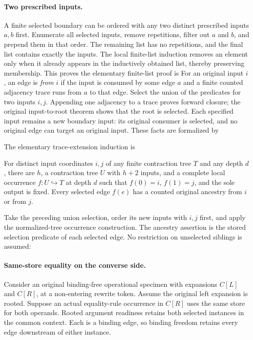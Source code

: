 \paragraph{Two prescribed inputs.}
A finite selected boundary can be ordered with any two distinct prescribed
inputs $a,b$ first. Enumerate all selected inputs, remove repetitions, filter
out $a$ and $b$, and prepend them in that order. The remaining list has no
repetitions, and the final list contains exactly the inputs. The local
finite-list induction removes an element only when it already appears in the
inductively obtained list, thereby preserving membership. This proves
the elementary finite-list proof is
For an original input $i$, an edge is \emph{from $i$} if the input is consumed
by some edge $a$ and a finite counted adjacency trace runs from $a$ to that
edge. Select the union of the predicates for two inputs $i,j$. Appending one
adjacency to a trace proves forward closure; the original input-to-root theorem
shows that the root is selected. Each specified input remains a new boundary
input: its original consumer is selected, and no original edge can target an
original input. These facts are formalized by
\par{}
The elementary trace-extension induction is
\begin{theorem}
For distinct input coordinates $i,j$ of any finite contraction tree $T$ and
any depth $d$, there are $h$, a contraction tree $U$ with $h+2$ inputs, and a
complete local occurrence $f:U\hookrightarrow T$ at depth $d$ such that
$f(0)=i$, $f(1)=j$, and the sole output is fixed. Every selected edge $f(e)$
has a counted original ancestry from $i$ or from $j$.
\end{theorem}
Take the preceding union selection, order its new inputs with $i,j$ first,
and apply the normalized-tree occurrence construction. The ancestry assertion
is the stored selection predicate of each selected edge. No restriction on
unselected siblings is assumed:
\paragraph{Same-store equality on the converse side.}
Consider an original binding-free operational specimen with expansions
$C[L]$ and $C[R]$, at a non-entering rewrite token. Assume the original left
expansion is rooted. Suppose an actual equality-rule occurrence in $C[R]$
uses the same store for both operands. Rooted argument readiness retains both
selected instances in the common context. Each is a binding edge, so binding
freedom retains every edge downstream of either instance.

